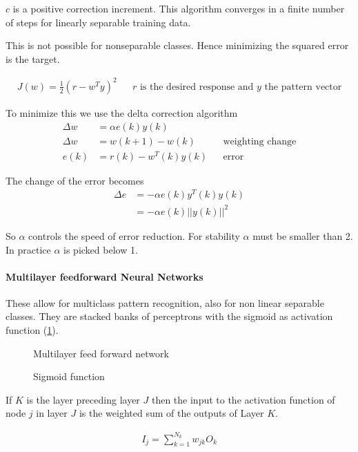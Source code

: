 $c$ is a positive correction increment.
This algorithm converges in a finite number of steps for linearly separable training data.

This is not possible for nonseparable classes.
Hence minimizing the squared error is the target.

\begin{align*}
J(w) = \frac{1}{2}(r-w^Ty)^2
&& r \text{ is the desired response and $y$ the pattern vector}
\end{align*}

To minimize this we use the delta correction algorithm
\begin{align*}
\Delta w &= \alpha e(k)y(k) \\
\Delta w &= w(k+1)-w(k) && \text{weighting change} \\
e(k) &= r(k) - w^T(k)y(k) && \text{error}
\end{align*}

The change of the error becomes
\begin{align*}
\Delta e &= -\alpha e(k) y^T(k) y(k) \\
 &= - \alpha e(k) ||y(k)||^2
\end{align*}

So $\alpha$ controls the speed of error reduction.
For stability $\alpha$ must be smaller than 2.
In practice $\alpha$ is picked below 1.

\paragraph{Multilayer feedforward Neural Networks}
These allow for multiclass pattern recognition, also for non linear separable classes.
They are stacked banks of perceptrons with the sigmoid as activation function (\ref{fig:sigmoid}).

\begin{figure}[htp]
\centering

\caption{Multilayer feed forward network}
\end{figure}

\begin{figure}[htp]
\centering

\caption{Sigmoid function}
\label{fig:sigmoid}
\end{figure}

If $K$ is the layer preceding layer $J$ then the input to the activation function of node $j$ in layer $J$ is the weighted sum of the outputs of Layer $K$.

\begin{align*}
I_j = \sum_{k=1}^{N_k}w_{jk}O_k
\end{align*}

